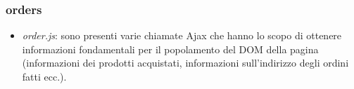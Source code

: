 \documentclass[14pt]{extarticle}
\begin{document}
\subsubsection*{orders}
\begin{itemize}
    \item \textit{order.js}: sono presenti varie chiamate Ajax che hanno lo scopo di ottenere informazioni
    fondamentali per il popolamento del DOM della pagina (informazioni dei prodotti acquistati,
    informazioni sull'indirizzo degli ordini fatti ecc.).
\end{itemize}
\end{document}
